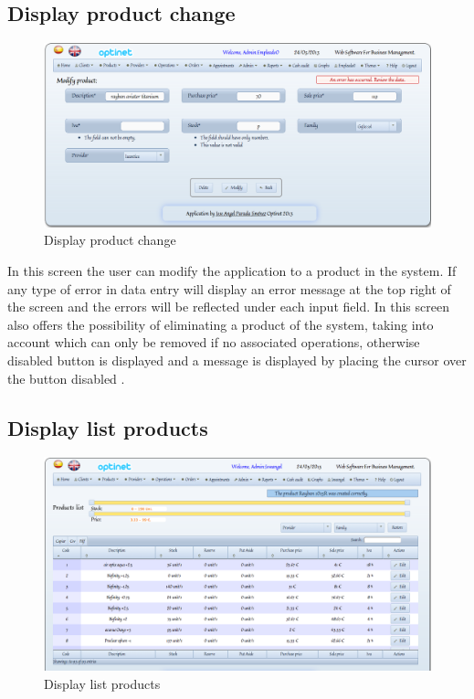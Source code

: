 \documentclass[a4paper,11pt]{book}
\begin{document}
\subsection {Display product change}

\begin{figure}[!htb]
  \centering
    \includegraphics[scale=0.35]{icapmodificarproducto.png}
  \caption{Display product change}
  \label{a}
\end{figure}

In this screen the user can modify the application to a product in the system. If any type of error in data entry will display an error message at the top right of the screen and the errors will be reflected under each input field. In this screen also offers the possibility of eliminating a product of the system, taking into account which can only be removed if no associated operations, otherwise disabled button is displayed and a message is displayed by placing the cursor over the button disabled .
\newpage
\subsection {Display list products}

\begin{figure}[!htb]
  \centering
    \includegraphics[scale=0.35]{icaplistarproductos.png}
  \caption{Display list products}
  \label{a}
\end{figure}
\end{document}
